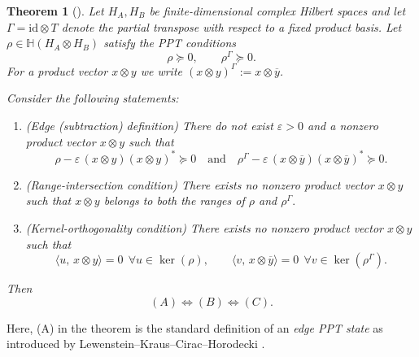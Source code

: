 \documentclass[12pt,a4paper]{amsart}
\theoremstyle{plain}
\newtheorem{theorem}{Theorem}[section]
\theoremstyle{remark}
\theoremstyle{definition}
\begin{document}
\begin{theorem}[\cite{Lewenstein2000}] \label{edgeW}
	Let $H_A,H_B$ be finite-dimensional complex Hilbert spaces and let
	$\Gamma=\mathrm{id}\otimes T$ denote the partial transpose with respect to a fixed product basis.
	Let $\rho\in\mathbb H(H_A\otimes H_B)$ satisfy the PPT conditions
	\[
	\rho\succeq 0,\qquad \rho^\Gamma\succeq 0.
	\]
	For a product vector $x\otimes y$ we write $(x\otimes y)^\Gamma:=x\otimes \overline y$.
	
	Consider the following statements:
	\begin{enumerate}
		\item[(A)] (\emph{Edge (subtraction) definition}) There do not exist $\varepsilon>0$ and a nonzero product vector
		$x\otimes y$ such that
		\[
		\rho-\varepsilon\, (x\otimes y)(x\otimes y)^* \succeq 0
		\quad\text{and}\quad
		\rho^\Gamma-\varepsilon\,(x\otimes \overline y)(x\otimes \overline y)^* \succeq 0.
		\]
		\item[(B)] (\emph{Range-intersection condition}) There exists no nonzero product vector $x\otimes y$ such that $x\otimes y$ belongs to both the ranges of $\rho$ and $\rho^\Gamma.$
		\item[(C)] (\emph{Kernel-orthogonality condition}) There exists no nonzero product vector $x\otimes y$ such that
		\[
		\langle u,\,x\otimes y\rangle=0\ \ \forall u\in\ker(\rho),
		\qquad
		\langle v,\,x\otimes \overline y\rangle=0\ \ \forall v\in\ker(\rho^\Gamma).
		\]
	\end{enumerate}
	Then
	\[(A)\iff (B)\iff (C).	\]
\end{theorem}
Here, (A) in the theorem is the standard definition of an \emph{edge PPT state} as introduced by
Lewenstein--Kraus--Cirac--Horodecki \cite[Sec.~III]{Lewenstein2000}.
\end{document}
